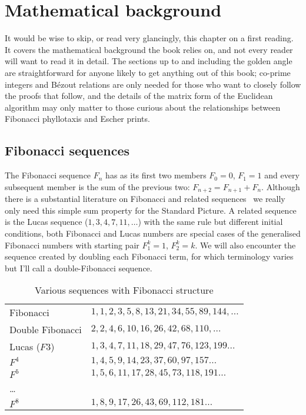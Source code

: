 

\chapter{Mathematical background}

 It would be wise to skip, or read very glancingly, this chapter on a first reading. It covers the mathematical background the book relies on, and not every reader will want to read it in detail. The sections up to and including the golden angle are straightforward for anyone likely to get anything out of this book; co-prime integers and B\'ezout relations are only needed for those who want to closely follow the proofs that follow, and the details of the matrix form of the Euclidean algorithm may only matter to those curious about the relationships between Fibonacci phyllotaxis and Escher prints.

\label{CH:0}
\label{ch:0}
\section{Fibonacci sequences}

The Fibonacci sequence $F_n$ has as its first two members  $F_0=0$, $F_1=1$ and every subsequent member is the sum of the previous two:  $F_{n+2}=F_{n+1}+F_{n}$. 
Although there is a substantial literature on Fibonacci and related sequences~\cite{vajdaFibonacciLucasNumbers2008} we really only need this simple sum property for the Standard Picture. 
A related sequence is the Lucas sequence  ($1,3,4,7,11,\ldots$) with the same rule but different initial conditions, both Fibonacci and Lucas numbers are special cases of the generalised Fibonacci numbers with starting pair $F^k_1=1$, $F^k_2=k$. We will also encounter the sequence created by doubling each Fibonacci term, for which terminology varies but I'll call a double-Fibonacci sequence. 
%
\begin{table}[ht]
	\begin{center}
		\begin{tabular}{ll}
			\hline
			Fibonacci  &  $1,1,2,3,5,8,13,21,34,55,89,144,\ldots$ \Tstrut
			\\
			Double Fibonacci & $2,2,4,6,10,16,26,42,68,110,\ldots$
			\\
			Lucas ($F3$)&      $ 1,3,4,7,11,18,29,47,76,123,199\ldots$
			\\
			$F^4$  & $1,4,5,9,14,23,37,60,97,157\ldots$
			\\
			$F^5$ & $1,5,6,11,17,28,45,73,118,191\ldots$
			\\
			\ldots &
			\\
			$F^8$ & $1,8,9,17,26,43,69,112,181\ldots$
			\\
			\hline
		\end{tabular}
		\caption{Various sequences with Fibonacci structure}
		\label{tab:sequences}
	\end{center}
\end{table}
%

